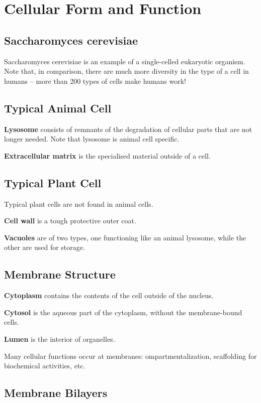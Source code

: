 \documentclass[11pt]{scrartcl}
\begin{document}
\section{Cellular Form and Function}

\subsection{Saccharomyces cerevisiae}

Saccharomyces cerevisiae is an example of a single-celled eukaryotic organism. Note that, in comparison, there are much more diversity in the type of a cell in humans -- more than 200 types of cells make humans work!

\subsection{Typical Animal Cell}

\textbf{Lysosome} consists of remnants of the degradation of cellular
parts that are not longer needed. Note that lysosome is animal cell specific.

\textbf{Extracellular matrix} is the specialised material outside of a cell.

\subsection{Typical Plant Cell}

Typical plant cells are not found in animal cells.

\textbf{Cell wall} is a tough protective outer coat.

\textbf{Vacuoles} are of two types, one functioning like an animal lysosome, while the other are used for storage.

\subsection{Membrane Structure}

\textbf{Cytoplasm} contains the contents of the cell outside of the nucleus.

\textbf{Cytosol} is the aqueous part of the cytoplasm, without the membrane-bound cells.

\textbf{Lumen} is the interior of organelles.

Many cellular functions occur at membranes: ompartmentalization, scaffolding for biochemical activities, etc.

\subsection{Membrane Bilayers}
\end{document}

